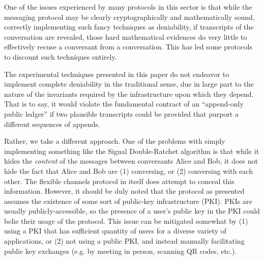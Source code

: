 One of the issues experienced by many protocols in this sector is that while the messaging protocol may be clearly cryptographically and mathematically sound, correctly implementing such fancy techniques as deniability, if transcripts of the conversation are revealed, those hard mathematical evidences do very little to effectively recuse a conversant from a conversation. This has led some protocols to discount such techniques entirely. \parencite{jefferys_session_2020, soatok_dont_2025}

The experimental techniques presented in this paper do not endeavor to implement complete deniability in the traditional sense, due in large part to the nature of the invariants required by the infrastructure upon which they depend. That is to say, it would violate the fundamental contract of an ``append-only public ledger'' if two plausible transcripts could be provided that purport a different sequences of appends.

Rather, we take a different approach. One of the problems with simply implementing something like the Signal Double-Ratchet algorithm is that while it hides the \emph{content} of the messages between conversants Alice and Bob, it does not hide the fact that Alice and Bob are (1) conversing, or (2) conversing with each other. The flexible channels protocol in itself does attempt to conceal this information. However, it should be duly noted that the protocol as presented assumes the existence of some sort of public-key infrastructure (PKI). PKIs are usually publicly-accessible, so the presence of a user's public key in the PKI could belie their usage of the protocol. This issue can be mitigated somewhat by (1) using a PKI that has sufficient quantity of users for a diverse variety of applications, or (2) not using a public PKI, and instead manually facilitating public key exchanges (e.g. by meeting in person, scanning QR codes, etc.).
